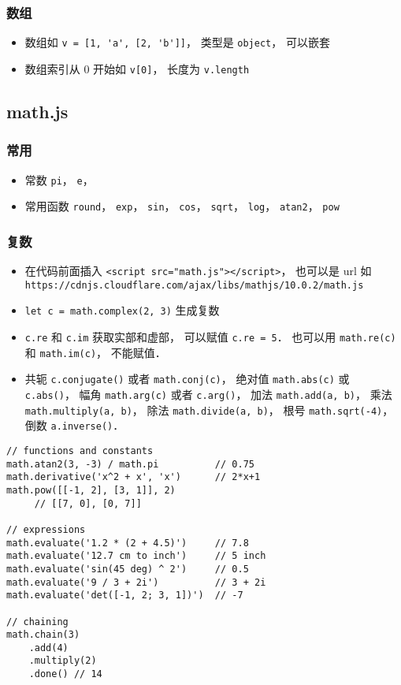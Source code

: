 \subsubsection{数组}
\begin{itemize}
\item 数组如 \verb|v = [1, 'a', [2, 'b']]|， 类型是 \verb|object|， 可以嵌套
\item 数组索引从 0 开始如 \verb|v[0]|， 长度为 \verb|v.length|
\end{itemize}


\subsection{math.js}
\subsubsection{常用}
\begin{itemize}
\item 常数 \verb|pi|， \verb|e|， 
\item 常用函数 \verb|round|， \verb|exp|， \verb|sin|， \verb|cos|， \verb|sqrt|， \verb|log|， \verb|atan2|， \verb|pow|
\end{itemize}

\subsubsection{复数}
\begin{itemize}
\item 在代码前面插入 \verb|<script src="math.js"></script>|， 也可以是 url 如 \verb|https://cdnjs.cloudflare.com/ajax/libs/mathjs/10.0.2/math.js|
\item \verb|let c = math.complex(2, 3)| 生成复数
\item \verb|c.re| 和 \verb|c.im| 获取实部和虚部， 可以赋值 \verb|c.re = 5|． 也可以用 \verb|math.re(c)| 和 \verb|math.im(c)|， 不能赋值．
\item 共轭 \verb|c.conjugate()| 或者 \verb|math.conj(c)|， 绝对值 \verb|math.abs(c)| 或 \verb|c.abs()|， 幅角 \verb|math.arg(c)| 或者 \verb|c.arg()|， 加法 \verb|math.add(a, b)|， 乘法 \verb|math.multiply(a, b)|， 除法 \verb|math.divide(a, b)|， 根号 \verb|math.sqrt(-4)|， 倒数 \verb|a.inverse()|．
\end{itemize}


\begin{lstlisting}
// functions and constants
math.atan2(3, -3) / math.pi          // 0.75
math.derivative('x^2 + x', 'x')      // 2*x+1
math.pow([[-1, 2], [3, 1]], 2)
     // [[7, 0], [0, 7]]

// expressions
math.evaluate('1.2 * (2 + 4.5)')     // 7.8
math.evaluate('12.7 cm to inch')     // 5 inch
math.evaluate('sin(45 deg) ^ 2')     // 0.5
math.evaluate('9 / 3 + 2i')          // 3 + 2i
math.evaluate('det([-1, 2; 3, 1])')  // -7

// chaining
math.chain(3)
    .add(4)
    .multiply(2)
    .done() // 14
\end{lstlisting}